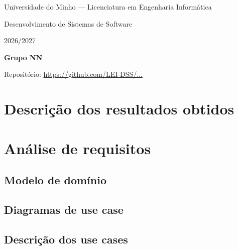 \documentclass[a4paper,11pt]{article}
\begin{document}
\begin{titlepage}
  \centering
  {\large Universidade do Minho --- Licenciatura em Engenharia Informática\par}
  \vspace{1cm}
  {\Large Desenvolvimento de Sistemas de Software\par}
  {\large 2026/2027\par}
  \vspace{2cm}
  {\LARGE\bfseries Grupo NN\par}
  \vspace{1.5cm}
  \hspace{0.3cm}
  \hspace{0.3cm}
  \vfill
  Repositório: \url{https://github.com/LEI-DSS/...}
\end{titlepage}

\tableofcontents
\newpage

\section{Descrição dos resultados obtidos}

\section{Análise de requisitos}
\subsection{Modelo de domínio}
\subsection{Diagramas de use case}
\subsection{Descrição dos use cases}
\end{document}
